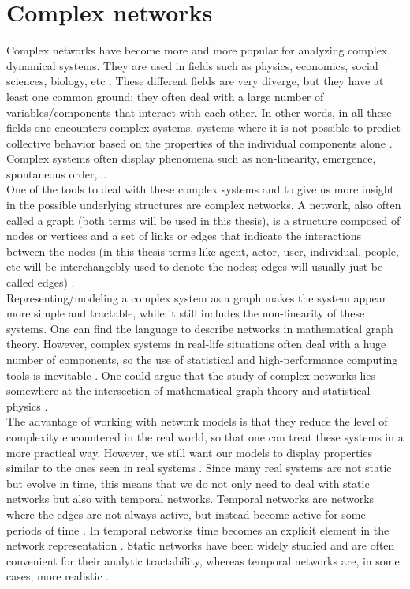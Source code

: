 \documentclass[11 pt , letterpaper , twoside , openright]{book}
\begin{document}
\section{Complex networks}\label{complNet}

Complex networks have become more and more popular for analyzing complex, dynamical systems. They are used in fields such as physics, economics, social sciences, biology, etc \cite{Costa2008}. These different fields are very diverge, but they have at least one common ground: they often deal with a large number of variables/components that interact with each other. In other words, in all these fields one encounters complex systems, systems where it is not possible to predict collective behavior based on the properties of the individual components alone \cite{Mata2020}. Complex systems often display phenomena such as non-linearity, emergence, spontaneous order,...
\\
\newline
One of the tools to deal with these complex systems and to give us more insight in the possible underlying structures are complex networks. A network, also often called a graph (both terms will be used in this thesis), is a structure composed of nodes or vertices and a set of links or edges that indicate the interactions between the nodes (in this thesis terms like agent, actor, user, individual, people, etc will be interchangebly used to denote the nodes; edges will usually just be called edges) \cite{Mata2020}.\\
\newline
Representing/modeling a complex system as a graph makes the system appear more simple and tractable, while it still includes the non-linearity of these systems. One can find the language to describe networks in mathematical graph theory. However, complex systems in real-life situations often deal with a huge number of components, so the use of statistical and high-performance computing tools is inevitable \cite{Mata2020}. One could argue that the study of complex networks lies somewhere at the intersection of mathematical graph theory and statistical physics \cite{F.Costa2007}.\\
\newline
The advantage of working with network models is that they reduce the level of complexity encountered in the real world, so that one can treat these systems in a more practical way. However, we still want our models to display properties similar to the ones seen in real systems \cite{Mata2020}. Since many real systems are not static but evolve in time, this means that we do not only need to deal with static networks but also with temporal networks. Temporal networks are networks where the edges are not always active, but instead become active for some periods of time \cite{Holme2012}. In temporal networks time becomes an explicit element in the network representation \cite{Holme2012}. Static networks have been widely studied and are often convenient for their analytic tractability, whereas temporal networks are, in some cases, more realistic \cite{Mata2020}.\\
\end{document}
